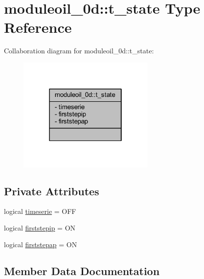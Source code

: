 \hypertarget{structmoduleoil__0d_1_1t__state}{}\section{moduleoil\+\_\+0d\+:\+:t\+\_\+state Type Reference}
\label{structmoduleoil__0d_1_1t__state}


Collaboration diagram for moduleoil\+\_\+0d\+:\+:t\+\_\+state\+:\nopagebreak
\begin{figure}[H]
\begin{center}
\leavevmode
\includegraphics[width=190pt]{structmoduleoil__0d_1_1t__state__coll__graph}
\end{center}
\end{figure}
\subsection*{Private Attributes}
\begin{DoxyCompactItemize}
\item 
logical \mbox{\hyperlink{structmoduleoil__0d_1_1t__state_ae49b133eb6b58026ebe12dc4afe3fd32}{timeserie}} = O\+FF
\item 
logical \mbox{\hyperlink{structmoduleoil__0d_1_1t__state_a876b74c843764c20141a40a4a348dc25}{firststepip}} = ON
\item 
logical \mbox{\hyperlink{structmoduleoil__0d_1_1t__state_a5f2fc5552216fa39cbabb2fb21bc188b}{firststepap}} = ON
\end{DoxyCompactItemize}


\subsection{Member Data Documentation}
\mbox{\label{structmoduleoil__0d_1_1t__state_a5f2fc5552216fa39cbabb2fb21bc188b}} 
